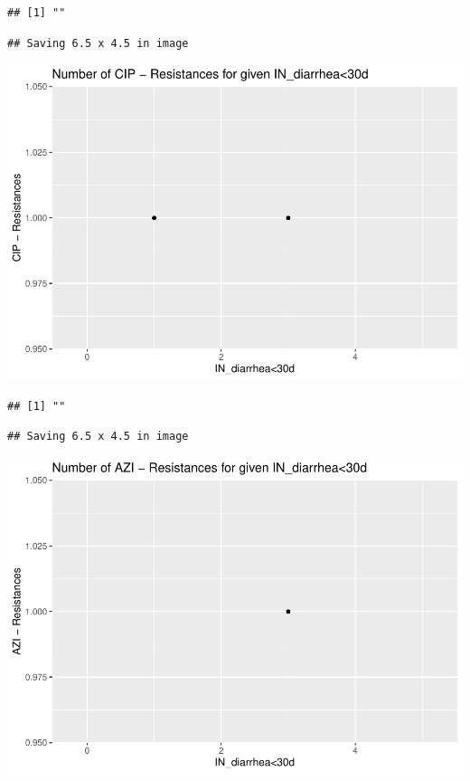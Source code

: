 \documentclass[
]{article}
\begin{document}
\begin{verbatim}
## [1] ""
\end{verbatim}

\begin{verbatim}
## Saving 6.5 x 4.5 in image
\end{verbatim}

\includegraphics{NResistenzen_files/figure-latex/numerical_variables-32.pdf}

\begin{verbatim}
## [1] ""
\end{verbatim}

\begin{verbatim}
## Saving 6.5 x 4.5 in image
\end{verbatim}

\includegraphics{NResistenzen_files/figure-latex/numerical_variables-33.pdf}
\end{document}
